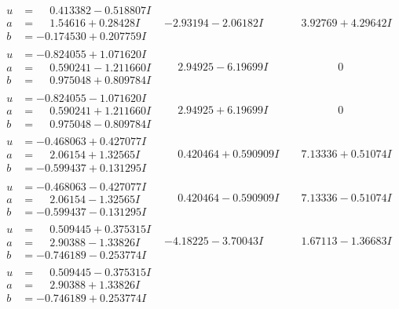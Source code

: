 \documentclass[1p]{elsarticle_modified}
\theoremstyle{definition}
\begin{document}
$$\begin{array}{c|c|c}
\begin{aligned}
u &= \phantom{-}0.413382 - 0.518807 I \\
a &= \phantom{-}1.54616 + 0.28428 I \\
b &= -0.174530 + 0.207759 I\end{aligned}
 & -2.93194 - 2.06182 I & \phantom{-}3.92769 + 4.29642 I \\ \hline\begin{aligned}
u &= -0.824055 + 1.071620 I \\
a &= \phantom{-}0.590241 - 1.211660 I \\
b &= \phantom{-}0.975048 + 0.809784 I\end{aligned}
 & \phantom{-}2.94925 - 6.19699 I & \phantom{-0.000000 } 0 \\ \hline\begin{aligned}
u &= -0.824055 - 1.071620 I \\
a &= \phantom{-}0.590241 + 1.211660 I \\
b &= \phantom{-}0.975048 - 0.809784 I\end{aligned}
 & \phantom{-}2.94925 + 6.19699 I & \phantom{-0.000000 } 0 \\ \hline\begin{aligned}
u &= -0.468063 + 0.427077 I \\
a &= \phantom{-}2.06154 + 1.32565 I \\
b &= -0.599437 + 0.131295 I\end{aligned}
 & \phantom{-}0.420464 + 0.590909 I & \phantom{-}7.13336 + 0.51074 I \\ \hline\begin{aligned}
u &= -0.468063 - 0.427077 I \\
a &= \phantom{-}2.06154 - 1.32565 I \\
b &= -0.599437 - 0.131295 I\end{aligned}
 & \phantom{-}0.420464 - 0.590909 I & \phantom{-}7.13336 - 0.51074 I \\ \hline\begin{aligned}
u &= \phantom{-}0.509445 + 0.375315 I \\
a &= \phantom{-}2.90388 - 1.33826 I \\
b &= -0.746189 - 0.253774 I\end{aligned}
 & -4.18225 - 3.70043 I & \phantom{-}1.67113 - 1.36683 I \\ \hline\begin{aligned}
u &= \phantom{-}0.509445 - 0.375315 I \\
a &= \phantom{-}2.90388 + 1.33826 I \\
b &= -0.746189 + 0.253774 I\end{aligned}

\end{array}$$
\end{document}
